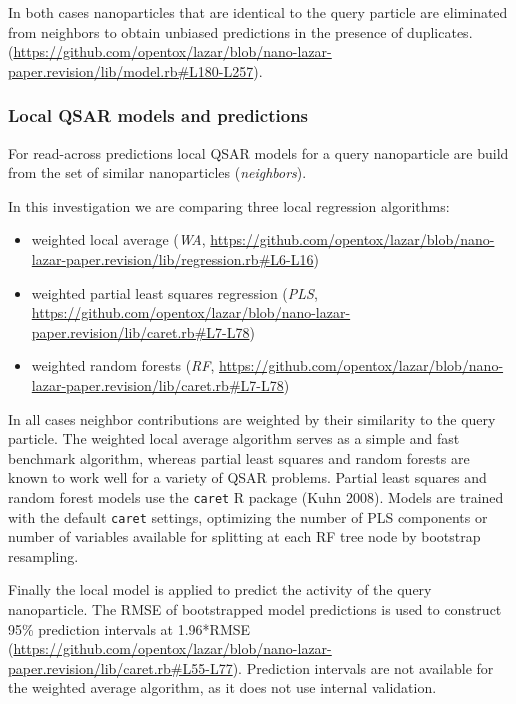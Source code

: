 \documentclass[utf8]{frontiersHLTH} %
\providecommand{\tightlist}{%
  \setlength{\itemsep}{0pt}\setlength{\parskip}{0pt}}
\begin{document}
In both cases nanoparticles that are identical to the query particle are
eliminated from neighbors to obtain unbiased predictions in the presence
of duplicates.
(\url{https://github.com/opentox/lazar/blob/nano-lazar-paper.revision/lib/model.rb\#L180-L257}).

\subsubsection{Local QSAR models and
predictions}\label{local-qsar-models-and-predictions}

For read-across predictions local QSAR models for a query nanoparticle
are build from the set of similar nanoparticles (\emph{neighbors}).

In this investigation we are comparing three local regression
algorithms:

\begin{itemize}
\tightlist
\item
  weighted local average (\emph{WA},
  \url{https://github.com/opentox/lazar/blob/nano-lazar-paper.revision/lib/regression.rb\#L6-L16})
\item
  weighted partial least squares regression (\emph{PLS},
  \url{https://github.com/opentox/lazar/blob/nano-lazar-paper.revision/lib/caret.rb\#L7-L78})
\item
  weighted random forests (\emph{RF},
  \url{https://github.com/opentox/lazar/blob/nano-lazar-paper.revision/lib/caret.rb\#L7-L78})
\end{itemize}

In all cases neighbor contributions are weighted by their similarity to
the query particle. The weighted local average algorithm serves as a
simple and fast benchmark algorithm, whereas partial least squares and
random forests are known to work well for a variety of QSAR problems.
Partial least squares and random forest models use the \texttt{caret} R
package (Kuhn 2008). Models are trained with the default \texttt{caret}
settings, optimizing the number of PLS components or number of variables
available for splitting at each RF tree node by bootstrap resampling.

Finally the local model is applied to predict the activity of the query
nanoparticle. The RMSE of bootstrapped model predictions is used to
construct 95\% prediction intervals at 1.96*RMSE
(\url{https://github.com/opentox/lazar/blob/nano-lazar-paper.revision/lib/caret.rb\#L55-L77}).
Prediction intervals are not available for the weighted average
algorithm, as it does not use internal validation.
\end{document}
